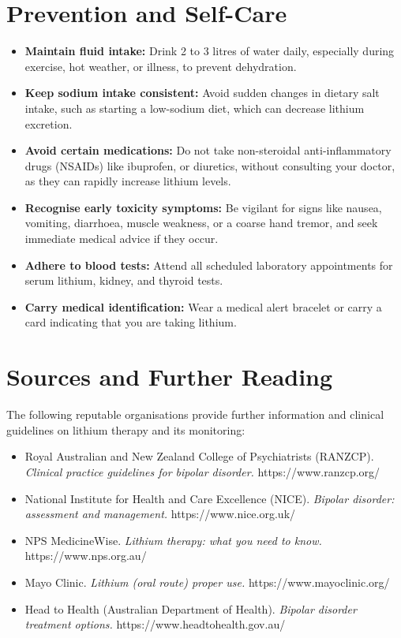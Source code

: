 \section*{Prevention and Self-Care}
\begin{itemize}
    \item \textbf{Maintain fluid intake:} Drink 2 to 3 litres of water daily, especially during exercise, hot weather, or illness, to prevent dehydration.
    \item \textbf{Keep sodium intake consistent:} Avoid sudden changes in dietary salt intake, such as starting a low-sodium diet, which can decrease lithium excretion.
    \item \textbf{Avoid certain medications:} Do not take non-steroidal anti-inflammatory drugs (NSAIDs) like ibuprofen, or diuretics, without consulting your doctor, as they can rapidly increase lithium levels.
    \item \textbf{Recognise early toxicity symptoms:} Be vigilant for signs like nausea, vomiting, diarrhoea, muscle weakness, or a coarse hand tremor, and seek immediate medical advice if they occur.
    \item \textbf{Adhere to blood tests:} Attend all scheduled laboratory appointments for serum lithium, kidney, and thyroid tests.
    \item \textbf{Carry medical identification:} Wear a medical alert bracelet or carry a card indicating that you are taking lithium.
\end{itemize}

\section*{Sources and Further Reading}
The following reputable organisations provide further information and clinical guidelines on lithium therapy and its monitoring:
\begin{itemize}
    \item Royal Australian and New Zealand College of Psychiatrists (RANZCP). \textit{Clinical practice guidelines for bipolar disorder.} https://www.ranzcp.org/
    \item National Institute for Health and Care Excellence (NICE). \textit{Bipolar disorder: assessment and management.} https://www.nice.org.uk/
    \item NPS MedicineWise. \textit{Lithium therapy: what you need to know.} https://www.nps.org.au/
    \item Mayo Clinic. \textit{Lithium (oral route) proper use.} https://www.mayoclinic.org/
    \item Head to Health (Australian Department of Health). \textit{Bipolar disorder treatment options.} https://www.headtohealth.gov.au/
\end{itemize}
